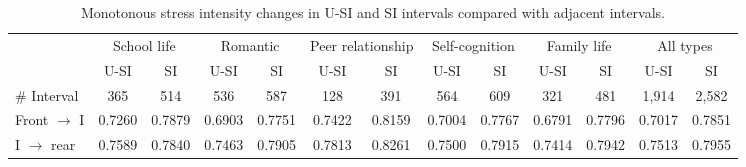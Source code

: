 \begin{table}[H]
\begin{center}
\caption{\small{Quantify the impact of scheduled positive school events using KTS (the knn-based two sample method adopted in this research) and baseline method.}}
\label{tab:schedule}
\end{center}
\end{table}

\begin{table}
\begin{center}
\caption{\small{Monotonous stress intensity changes in U-SI and SI intervals compared with adjacent intervals.}}
\small{
\begin{tabular}{l cccccc cccccc} \\\hline\hline
\multirow{2}{1cm}{}
&\multicolumn{2}{c}{School life}
&\multicolumn{2}{c}{Romantic}
&\multicolumn{2}{c}{Peer relationship}
&\multicolumn{2}{c}{Self-cognition}
&\multicolumn{2}{c}{Family life}
&\multicolumn{2}{c}{All types}\\
&U-SI	    &	SI	        &U-SI	    &SI	        &U-SI	   &SI	
&U-SI	    &	SI	        &	U-SI	&SI	        &U-SI	   &SI\\  \hline
\# Interval         &   365	        &	514	        &	536	        &	587	        &128	    &	391	        &	564	           &	609	            &	321	        &	481	        &	1,914	    &2,582	 \\
Front $\rightarrow$ I &	0.7260 	&	0.7879 	&	0.6903 	&	0.7751 	&	0.7422 	&	0.8159 	&	0.7004 	&	0.7767 	&	0.6791 &	0.7796 	&	0.7017 	&   0.7851\\
I $\rightarrow$ rear  &	0.7589 	&	0.7840 	&	0.7463 	&	0.7905 	&	0.7813 	&	0.8261 	&	0.7500 	&	0.7915 	&	0.7414 	&	0.7942 	&	0.7513 	&   0.7955\\ \hline \hline
\end{tabular}}%
\label{tab:fontrear}
\end{center}
\end{table}

